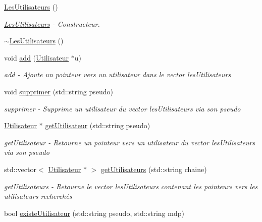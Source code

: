 \begin{DoxyCompactItemize}
\item 
\hyperlink{class_les_utilisateurs_a259a566889379f68f0e7f51fd2f4937b}{Les\-Utilisateurs} ()
\begin{DoxyCompactList}\small\item\em \hyperlink{class_les_utilisateurs}{Les\-Utilisateurs} -\/ Constructeur. \end{DoxyCompactList}\item 
\hyperlink{class_les_utilisateurs_a6968c708c6df8a1667da075d53a70758}{$\sim$\-Les\-Utilisateurs} ()
\item 
void \hyperlink{class_les_utilisateurs_ab5c478d010984c3357b3d6ea67460b8e}{add} (\hyperlink{class_utilisateur}{Utilisateur} $\ast$u)
\begin{DoxyCompactList}\small\item\em add -\/ Ajoute un pointeur vers un utilisateur dans le vector les\-Utilisateurs \end{DoxyCompactList}\item 
void \hyperlink{class_les_utilisateurs_a3ce112f12307d71f0d9cb74bc2cb506a}{supprimer} (std\-::string pseudo)
\begin{DoxyCompactList}\small\item\em supprimer -\/ Supprime un utilisateur du vector les\-Utilisateurs via son pseudo \end{DoxyCompactList}\item 
\hyperlink{class_utilisateur}{Utilisateur} $\ast$ \hyperlink{class_les_utilisateurs_a7246fbe92f69bf2940a713430c56aa31}{get\-Utilisateur} (std\-::string pseudo)
\begin{DoxyCompactList}\small\item\em get\-Utilisateur -\/ Retourne un pointeur vers un utilisateur du vector les\-Utilisateurs via son pseudo \end{DoxyCompactList}\item 
std\-::vector$<$ \hyperlink{class_utilisateur}{Utilisateur} $\ast$ $>$ \hyperlink{class_les_utilisateurs_ab2a60ecbf68c26a78f5b304ffb80395e}{get\-Utilisateurs} (std\-::string chaine)
\begin{DoxyCompactList}\small\item\em get\-Utilisateurs -\/ Retourne le vector les\-Utilisateurs contenant les pointeurs vers les utilisateurs recherchés \end{DoxyCompactList}\item 
bool \hyperlink{class_les_utilisateurs_a0a06030c9a660be944b00a9300ae2044}{existe\-Utilisateur} (std\-::string pseudo, std\-::string mdp)

\end{DoxyCompactItemize}
